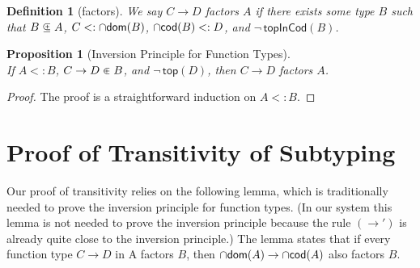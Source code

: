 \documentclass{article}
\newtheorem{proposition}[theorem]{Proposition}
\newtheorem{definition}[theorem]{Definition}
\begin{document}
\begin{definition}[factors]
  We say $C \to D$ \emph{factors} $A$
  if there exists some type $B$ such that
  $B \subsetpluseq A$, $C <: \cap\mathsf{dom}(B)$, $\cap\mathsf{cod}(B) <: D$, and
  $\neg\,\mathsf{topInCod}(B)$.
\end{definition}

\begin{proposition}[Inversion Principle for Function Types]
  \label{prop:⊑-fun-inv}\ \\
  If $A <: B$, $C \to D \inplus B$, and $\neg\,\mathsf{top}(D)$, then
  $C \to D$ factors $A$.
\end{proposition}
\begin{proof}
  The proof is a straightforward induction on $A <: B$.
\end{proof}

\section{Proof of Transitivity of Subtyping}
\label{sec:trans}

Our proof of transitivity relies on the following lemma, which is
traditionally needed to prove the inversion principle for function
types. (In our system this lemma is not needed to prove the inversion
principle because the rule $(\to')$ is already quite close to the
inversion principle.)  The lemma states that if every function type $C
\to D$ in A factors $B$, then $\cap\mathsf{dom}(A) \to \cap\mathsf{cod}(A)$ also factors $B$.
\end{document}
